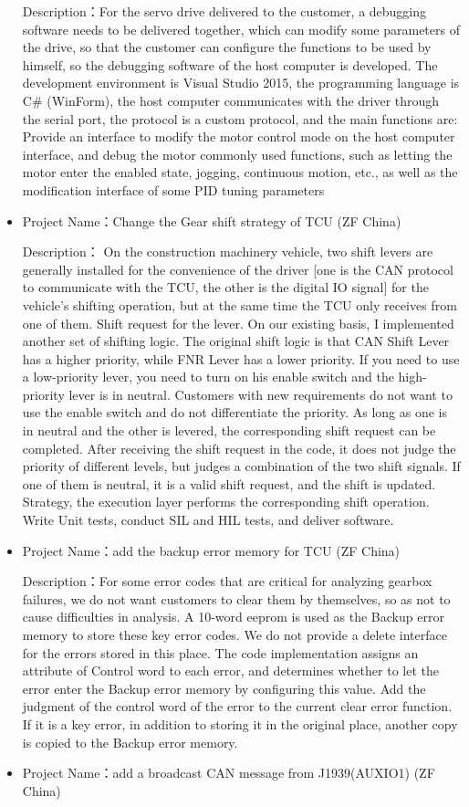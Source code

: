 \documentclass[
]{article}
\begin{document}
\begin{CJK}{UTF8}{gbsn}
\begin{itemize}
  Description：For the servo drive delivered to the customer, a
  debugging software needs to be delivered together, which can modify
  some parameters of the drive, so that the customer can configure the
  functions to be used by himself, so the debugging software of the host
  computer is developed. The development environment is Visual Studio
  2015, the programming language is C\# (WinForm), the host computer
  communicates with the driver through the serial port, the protocol is
  a custom protocol, and the main functions are: Provide an interface to
  modify the motor control mode on the host computer interface, and
  debug the motor commonly used functions, such as letting the motor
  enter the enabled state, jogging, continuous motion, etc., as well as
  the modification interface of some PID tuning parameters
\item
  Project Name：Change the Gear shift strategy of TCU (ZF China)

  Description： On the construction machinery vehicle, two shift levers
  are generally installed for the convenience of the driver {[}one is
  the CAN protocol to communicate with the TCU, the other is the digital
  IO signal{]} for the vehicle's shifting operation, but at the same
  time the TCU only receives from one of them. Shift request for the
  lever. On our existing basis, I implemented another set of shifting
  logic. The original shift logic is that CAN Shift Lever has a higher
  priority, while FNR Lever has a lower priority. If you need to use a
  low-priority lever, you need to turn on his enable switch and the
  high-priority lever is in neutral. Customers with new requirements do
  not want to use the enable switch and do not differentiate the
  priority. As long as one is in neutral and the other is levered, the
  corresponding shift request can be completed. After receiving the
  shift request in the code, it does not judge the priority of different
  levels, but judges a combination of the two shift signals. If one of
  them is neutral, it is a valid shift request, and the shift is
  updated. Strategy, the execution layer performs the corresponding
  shift operation. Write Unit tests, conduct SIL and HIL tests, and
  deliver software.
\item
  Project Name：add the backup error memory for TCU (ZF China)

  Description：For some error codes that are critical for analyzing
  gearbox failures, we do not want customers to clear them by
  themselves, so as not to cause difficulties in analysis. A 10-word
  eeprom is used as the Backup error memory to store these key error
  codes. We do not provide a delete interface for the errors stored in
  this place. The code implementation assigns an attribute of Control
  word to each error, and determines whether to let the error enter the
  Backup error memory by configuring this value. Add the judgment of the
  control word of the error to the current clear error function. If it
  is a key error, in addition to storing it in the original place,
  another copy is copied to the Backup error memory.
\item
  Project Name：add a broadcast CAN message from J1939(AUXIO1) (ZF
  China)


\end{itemize}
\end{CJK}
\end{document}

